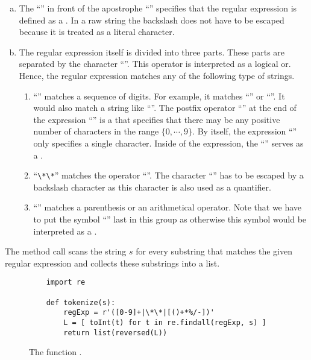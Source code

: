 \begin{enumerate}[(a)]
\item The ``'' in front of the apostrophe ``'' specifies that the regular expression is
      defined as a .  In a raw string the backslash does not have to be
      escaped because it is treated as a literal character.
\item The regular expression itself is divided into three parts.
      These parts are separated by the character ``\mytt{|}''.  This operator is interpreted as a logical or.
      Hence, the regular expression matches any of the following type of strings.
      \begin{enumerate}
      \item ``\mytt{[0-9]+}'' matches a sequence of digits.  For example, it matches ``'' or
            ``''.  It would also match a string like ``''.
            The postfix operator ``\mytt{+}'' at the end of the expression ``\mytt{[0-9]}'' is a
             that specifies that there may be any positive number of characters in the range
            $\{0,\cdots,9\}$.  By itself, the expression ``\mytt{[0-9]}'' only specifies a single character.
            Inside of the expression, the ``\mytt{-}'' serves as a .
      \item ``\verb|\*\*|'' matches the operator ``\mytt{**}''.  The character ``\mytt{*}'' has to be
            escaped by a backslash character as this character is also used as a quantifier.
      \item ``\mytt{[()+*/\%-]}'' matches a parenthesis or an arithmetical operator. Note that we have 
            to put the symbol ``\mytt{-}'' last in this group as otherwise this symbol would be 
            interpreted as a .
     \end{enumerate}
\end{enumerate}
The method call  scans the string $s$ for every substring that matches the
given regular expression and collects these substrings into a list.


\begin{figure}[!ht]
\centering
\begin{verbatim}
    import re

    def tokenize(s):
        regExp = r'([0-9]+|\*\*|[()+*%/-])'
        L = [ toInt(t) for t in re.findall(regExp, s) ]
        return list(reversed(L))                 
\end{verbatim}
\vspace*{-0.3cm}
\caption{The function .}
\label{fig:tokenize.py}
\end{figure}


